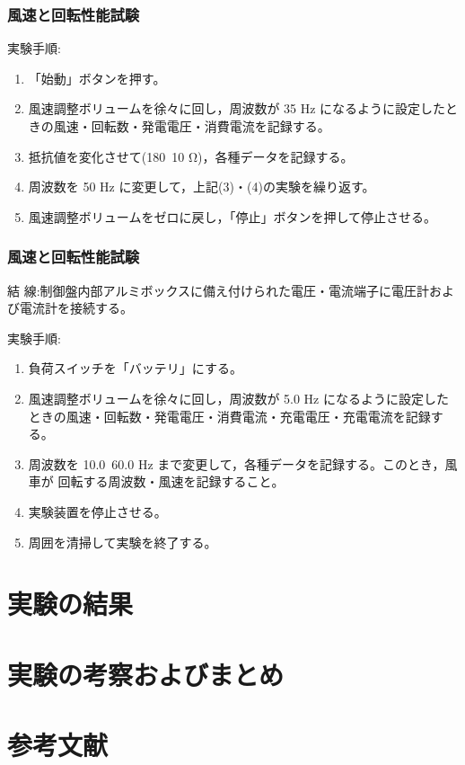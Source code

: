\documentclass[a4paper,11pt,xelatex,ja=standard]{bxjsarticle}
\begin{document}
        \subsubsection{風速と回転性能試験}
            実験手順:
                \begin{enumerate}
                        \item 「始動」ボタンを押す。
                        \item 風速調整ボリュームを徐々に回し，周波数が 35 Hz になるように設定したときの風速・回転数・発電電圧・消費電流を記録する。
                        \item 抵抗値を変化させて(180~10 Ω)，各種データを記録する。
                        \item 周波数を 50 Hz に変更して，上記(3)・(4)の実験を繰り返す。
                        \item 風速調整ボリュームをゼロに戻し，「停止」ボタンを押して停止させる。
                \end{enumerate}

        \subsubsection{風速と回転性能試験}
            結 線:制御盤内部アルミボックスに備え付けられた電圧・電流端子に電圧計および電流計を接続する。

            実験手順:
                \begin{enumerate}
                        \item 負荷スイッチを「バッテリ」にする。
                        \item 風速調整ボリュームを徐々に回し，周波数が 5.0 Hz になるように設定したときの風速・回転数・発電電圧・消費電流・充電電圧・充電電流を記録する。
                        \item 周波数を 10.0~60.0 Hz まで変更して，各種データを記録する。このとき，風車が
                        回転する周波数・風速を記録すること。
                        \item 実験装置を停止させる。
                        \item 周囲を清掃して実験を終了する。
                \end{enumerate}


\section{実験の結果}
\section{実験の考察およびまとめ}
\section{参考文献}
\end{document}
